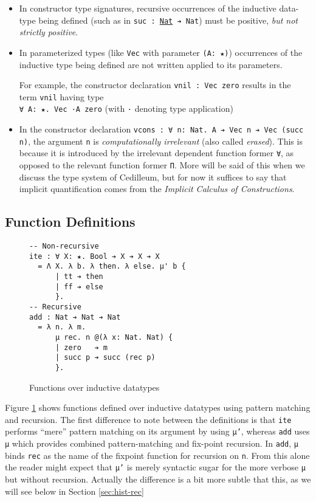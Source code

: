 \documentclass{article}
\begin{document}
\begin{itemize}
\item In constructor type signatures, recursive occurrences of the inductive
  data-type being defined (such as in \texttt{suc : \underline{Nat} ➔ Nat}) must
  be positive, \textit{but not strictly positive}.
\item In parameterized types (like \texttt{Vec} with parameter \texttt{(A: ★)})
  occurrences of the inductive type being defined are not written applied to
  its parameters.
  
  For example, the constructor declaration \texttt{vnil : Vec zero} results in
  the term \texttt{vnil} having type \\ \texttt{∀ A: ★. Vec ·A zero} (with \texttt{·}
  denoting type application)
\item In the constructor declaration \texttt{vcons : ∀ n: Nat. A ➔ Vec n ➔ Vec
    (succ n)}, the argument \texttt{n} is \textit{computationally irrelevant}
  (also called \textit{erased}). This is because it is introduced by the
  irrelevant dependent function former \texttt{∀}, as opposed to the relevant
  function former \texttt{Π}. More will be said of this when we discuss the type
  system of Cedilleum, but for now it suffices to say that implicit
  quantification comes from the \textit{Implicit Calculus of
    Constructions}\cite{Mi01_ICC}.
\end{itemize}

\subsection{Function Definitions}
\begin{figure}[h]
\begin{verbatim}
-- Non-recursive
ite : ∀ X: ★. Bool ➔ X ➔ X ➔ X
  = Λ X. λ b. λ then. λ else. μ' b {
      | tt ➔ then
      | ff ➔ else
      }.
-- Recursive
add : Nat ➔ Nat ➔ Nat
  = λ n. λ m.
      μ rec. n @(λ x: Nat. Nat) {
      | zero   ➔ m
      | succ p ➔ succ (rec p)
      }.
\end{verbatim}
  \caption{Functions over inductive datatypes}
  \label{fig:ex-data-fun}
\end{figure}

Figure \ref{fig:ex-data-fun} shows functions defined over inductive datatypes
using pattern matching and recursion. The first difference to note between the
definitions is that \texttt{ite} performs ``mere''
pattern matching on its argument by using \texttt{μ'}, whereas \texttt{add}
uses \texttt{μ} which provides combined pattern-matching and fix-point
recursion. In \texttt{add}, \texttt{μ} binds \texttt{rec} as the name of the
fixpoint function for recursion on \texttt{n}. From this alone the reader might
expect that \texttt{μ'} is merely syntactic sugar for the more verbose
\texttt{μ} but without recursion. Actually the difference is a bit more subtle
that this, as we will see below in Section \ref{sec:hist-rec}
\end{document}
